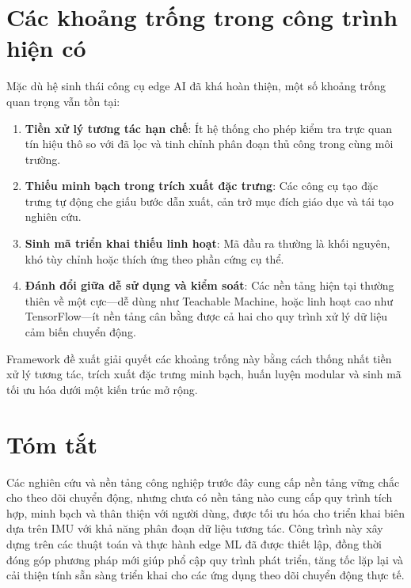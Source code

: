 \section{Các khoảng trống trong công trình hiện có}
Mặc dù hệ sinh thái công cụ edge AI đã khá hoàn thiện, một số khoảng trống quan trọng vẫn tồn tại:
\begin{enumerate}
    \item \textbf{Tiền xử lý tương tác hạn chế}: Ít hệ thống cho phép kiểm tra trực quan tín hiệu thô so với đã lọc và tinh chỉnh phân đoạn thủ công trong cùng môi trường.
    \item \textbf{Thiếu minh bạch trong trích xuất đặc trưng}: Các công cụ tạo đặc trưng tự động che giấu bước dẫn xuất, cản trở mục đích giáo dục và tái tạo nghiên cứu.
    \item \textbf{Sinh mã triển khai thiếu linh hoạt}: Mã đầu ra thường là khối nguyên, khó tùy chỉnh hoặc thích ứng theo phần cứng cụ thể.
    \item \textbf{Đánh đổi giữa dễ sử dụng và kiểm soát}: Các nền tảng hiện tại thường thiên về một cực---dễ dùng như Teachable Machine, hoặc linh hoạt cao như TensorFlow---ít nền tảng cân bằng được cả hai cho quy trình xử lý dữ liệu cảm biến chuyển động.
\end{enumerate}
Framework đề xuất giải quyết các khoảng trống này bằng cách thống nhất tiền xử lý tương tác, trích xuất đặc trưng minh bạch, huấn luyện modular và sinh mã tối ưu hóa dưới một kiến trúc mở rộng.

\section{Tóm tắt}
Các nghiên cứu và nền tảng công nghiệp trước đây cung cấp nền tảng vững chắc cho theo dõi chuyển động, nhưng chưa có nền tảng nào cung cấp quy trình tích hợp, minh bạch và thân thiện với người dùng, được tối ưu hóa cho triển khai biên dựa trên IMU với khả năng phân đoạn dữ liệu tương tác. Công trình này xây dựng trên các thuật toán và thực hành edge ML đã được thiết lập, đồng thời đóng góp phương pháp mới giúp phổ cập quy trình phát triển, tăng tốc lặp lại và cải thiện tính sẵn sàng triển khai cho các ứng dụng theo dõi chuyển động thực tế.
